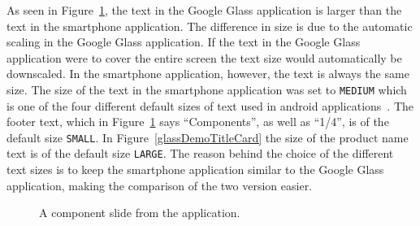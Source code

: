 As seen in Figure~\ref{glassDemoComponentText}, the text in the Google Glass application is larger than the text in the smartphone application. The difference in size is due to the automatic scaling in the Google Glass application. If the text in the Google Glass application were to cover the entire screen the text size would automatically be downscaled. In the smartphone application, however, the text is always the same size. The size of the text in the smartphone application was set to \texttt{MEDIUM} which is one of the four different default sizes of text used in android applications~\cite{androidTextSize}. The footer text, which in Figure~\ref{glassDemoComponentText} says ``Components'', as well as ``1/4'', is of the default size \texttt{SMALL}. In Figure~\ref{glassDemoTitleCard} the size of the product name text is of the default size \texttt{LARGE}. The reason behind the choice of the different text sizes is to keep the smartphone application similar to the Google Glass application, making the comparison of the two version easier.

		\begin{figure}[ht!]
		\centering
   		 \qquad
   		 \qquad
		\caption{A component slide from the application.}
		\label{glassDemoComponentText}
	\end{figure}

